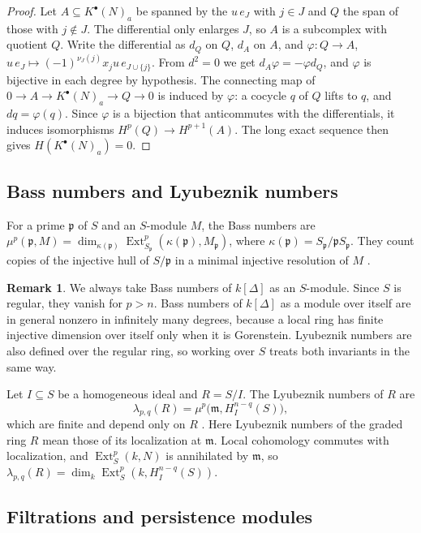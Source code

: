 \documentclass[11pt]{article}
\theoremstyle{plain}
\theoremstyle{definition}
\newtheorem{remark}[theorem]{Remark}
\newcommand{\kk}{k}
\newcommand{\pp}{\mathfrak{p}}
\newcommand{\mm}{\mathfrak{m}}
\newcommand{\Ext}{\operatorname{Ext}}
\newcommand{\Hloc}[2]{H^{#1}_{#2}}
\begin{document}
\begin{proof}
Let $A\subseteq K^\bullet(N)_a$ be spanned by the $u\,e_J$ with $j\in J$ and $Q$ the span of those with
$j\notin J$. The differential only enlarges $J$, so $A$ is a subcomplex with quotient $Q$. Write the
differential as $d_Q$ on $Q$, $d_A$ on $A$, and $\varphi\colon Q\to A$, $u\,e_J\mapsto(-1)^{\nu_J(j)}x_ju\,e_{J\cup\{j\}}$.
From $d^2=0$ we get $d_A\varphi=-\varphi d_Q$, and $\varphi$ is bijective in each degree by hypothesis.
The connecting map of $0\to A\to K^\bullet(N)_a\to Q\to0$ is induced by $\varphi$: a cocycle $q$ of $Q$ lifts to
$q$, and $d q=\varphi(q)$. Since $\varphi$ is a bijection that anticommutes with the differentials, it
induces isomorphisms $H^p(Q)\to H^{p+1}(A)$. The long exact sequence then gives $H(K^\bullet(N)_a)=0$.
\end{proof}

\subsection{Bass numbers and Lyubeznik numbers}

For a prime $\pp$ of $S$ and an $S$-module $M$, the Bass numbers are
$\mu^p(\pp,M)=\dim_{\kappa(\pp)}\Ext^p_{S_\pp}(\kappa(\pp),M_\pp)$, where $\kappa(\pp)=S_\pp/\pp S_\pp$.
They count copies of the injective hull of $S/\pp$ in a minimal injective resolution of $M$
\cite[\S3.2]{BrunsHerzog}.

\begin{remark}\label{rem:over-S}
We always take Bass numbers of $\kk[\Delta]$ as an $S$-module. Since $S$ is regular, they vanish for
$p>n$. Bass numbers of $\kk[\Delta]$ as a module over itself are in general nonzero in infinitely many
degrees, because a local ring has finite injective dimension over itself only when it is Gorenstein.
Lyubeznik numbers are also defined over the regular ring, so working over $S$ treats both invariants
in the same way.
\end{remark}

Let $I\subseteq S$ be a homogeneous ideal and $R=S/I$. The Lyubeznik numbers of $R$ are
\[
\lambda_{p,q}(R)=\mu^p\bigl(\mm,\Hloc{n-q}{I}(S)\bigr),
\]
which are finite and depend only on $R$ \cite{Lyubeznik,HunekeSharp}. Here Lyubeznik numbers of the
graded ring $R$ mean those of its localization at $\mm$. Local cohomology commutes with localization,
and $\Ext^p_S(\kk,N)$ is annihilated by $\mm$, so
$\lambda_{p,q}(R)=\dim_\kk\Ext^p_S(\kk,\Hloc{n-q}{I}(S))$.

\subsection{Filtrations and persistence modules}
\end{document}
